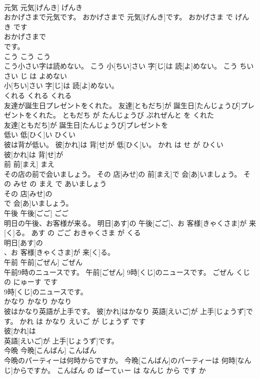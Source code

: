 \documentclass[8pt]{extreport}
\begin{document}
\begin{CJK}{UTF8}{min}
\\	元気	元気[げんき]	げんき	
\\	おかげさまで元気です。	おかげさまで 元気[げんき]です。	おかげさま で げんき です	
\\	おかげさまで
\\	です。			
\\	こう	こう	こう	
\\	こう小さい字は読めない。	こう 小[ちい]さい 字[じ]は 読[よ]めない。	こう ちいさい じ は よめない	
\\	小[ちい]さい 字[じ]は 読[よ]めない。			
\\	くれる	くれる	くれる	
\\	友達が誕生日プレゼントをくれた。	友達[ともだち]が 誕生日[たんじょうび]プレゼントをくれた。	ともだち が たんじょうび ぷれぜんと を くれた	
\\	友達[ともだち]が 誕生日[たんじょうび]プレゼントを
\\	低い	低[ひく]い	ひくい	
\\	彼は背が低い。	彼[かれ]は 背[せ]が 低[ひく]い。	かれ は せ が ひくい	
\\	彼[かれ]は 背[せ]が
\\	前	前[まえ]	まえ	
\\	その店の前で会いましょう。	その 店[みせ]の 前[まえ]で 会[あ]いましょう。	その みせ の まえ で あいましょう	
\\	その 店[みせ]の
\\	で 会[あ]いましょう。			
\\	午後	午後[ごご]	ごご	
\\	明日の午後、お客様が来る。	明日[あす]の 午後[ごご]、お 客様[きゃくさま]が 来[く]る。	あす の ごご おきゃくさま が くる	
\\	明日[あす]の
\\	、お 客様[きゃくさま]が 来[く]る。			
\\	午前	午前[ごぜん]	ごぜん	
\\	午前9時のニュースです。	午前[ごぜん] 9時[くじ]のニュースです。	ごぜん くじ の にゅーす です	
\\	9時[くじ]のニュースです。			
\\	かなり	かなり	かなり	
\\	彼はかなり英語が上手です。	彼[かれ]はかなり 英語[えいご]が 上手[じょうず]です。	かれ は かなり えいご が じょうず です	
\\	彼[かれ]は
\\	英語[えいご]が 上手[じょうず]です。			
\\	今晩	今晩[こんばん]	こんばん	
\\	今晩のパーティーは何時からですか。	今晩[こんばん]のパーティーは 何時[なんじ]からですか。	こんばん の ぱーてぃー は なんじ から です か	

\end{CJK}
\end{document}
